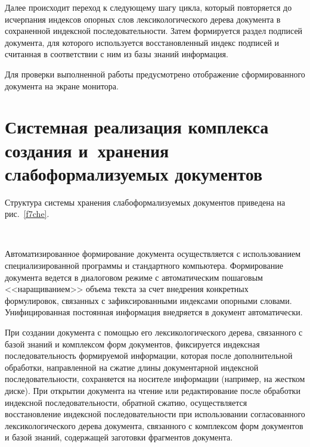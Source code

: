 \begin{multicols}{2}
{}
     
     Далее происходит переход к следующему шагу цикла, который 
повторяется до исчерпания индексов опорных слов лексикологического дерева\linebreak 
документа в сохраненной индексной последовательности. Затем формируется 
раздел подписей документа, для которого используется восстановленный 
индекс подписей и считанная в соответствии с ним из базы знаний информация.
     
     Для проверки выполненной работы предус\-мот\-ре\-но отображение 
сформированного документа на экране монитора.

\section{Системная реализация комплекса создания и~хранения 
слабоформализуемых документов}
     
     Структура системы хранения слабоформали\-зу\-емых документов 
приведена на рис.~\ref{f7che}.

\begin{figure*} %
\vspace*{1pt}
\begin{center}
\mbox{%
\epsfxsize=162.925mm
}
\end{center}
\vspace*{-6pt}
\vspace*{6pt}
\end{figure*}
     
     Автоматизированное формирование документа осуществляется с 
использованием специализированной программы и стандартного компьютера. 
Формирование документа ведется в диалоговом режиме с автоматическим 
пошаговым <<наращиванием>> объема текста за счет внедрения конкретных 
формулировок, связанных с зафиксированными индексами опорными словами. 
Унифицированная постоянная информация внедряется в документ 
автоматически.
     
     При создании документа с помощью его лексикологического дерева, 
связанного с базой знаний и комплексом форм документов, фиксируется 
индексная последовательность формируемой информации, которая после 
дополнительной обработки, направленной на сжатие длины документарной 
индексной последовательности, сохраняется на носителе информации 
(например, на жестком диске).\linebreak
При открытии документа на чтение или 
редактирование после обработки индексной последовательности, обратной 
сжатию, осуществляется восстановление индексной последовательности при\linebreak 
использовании согласованного лексикологического дерева документа, 
связанного с комплексом форм документов и базой знаний, содержащей 
заготовки фрагментов документа.
     

\end{multicols}
